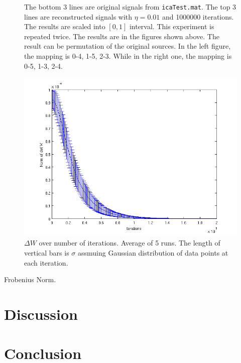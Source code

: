 \documentclass[10pt]{article}
\begin{document}
\begin{figure}
\begin{subfigure}[b]{0.49\textwidth}
\end{subfigure}
\caption{The bottom 3 lines are original signals from
\texttt{icaTest.mat}. The top 3 lines are reconstructed signals with
$\eta = 0.01$ and 1000000 iterations. The results are scaled into $[0, 1]$
interval. This experiment is repeated twice.  The results are in the
figures shown above. The result can be permutation of the original sources.
In the left figure, the mapping is 0-4, 1-5, 2-3. While in the right one,
the mapping is 0-5, 1-3, 2-4.}
\label{fig:rep}
\end{figure}

\begin{figure}
\centering
\includegraphics[width=.6\textwidth]{detW.png}
\caption{$\Delta W$ over number of iterations. Average of 5 runs. The
length of vertical bars is $\sigma$ assmuing Gaussian distribution of data
points at each iteration.}
\label{fig:detW}
\end{figure}

Frobenius Norm.

\section{Discussion}

\section{Conclusion}
\end{document}
